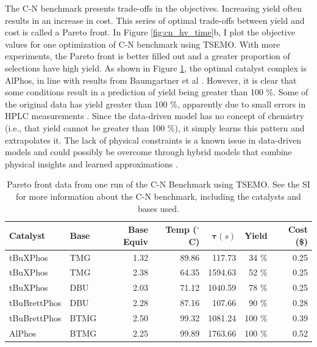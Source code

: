 The C-N benchmark presents trade-offs in the objectives. Increasing yield often results in an increase in cost. This series of optimal trade-offs between yield and cost is called a Pareto front. In Figure \ref{fig:cn_hv_time}b, I plot the objective values for one optimization of C-N benchmark using TSEMO. With more experiments, the Pareto front is better filled out and a greater proportion of selections have high yield. As shown in Figure \ref{tab:cn_benchmark_results}, the optimal catalyst complex is AlPhos, in line with results from Baumgartner et al \cite{Baumgartner2019}. However, it is clear that some conditions result in a prediction of yield being greater than 100 \%. Some of the original data has yield greater than 100 \%, apparently due to small errors in HPLC measurements \cite{Baumgartner2019}. Since the data-driven model has no concept of chemistry (i.e., that yield cannot be greater than 100 \%), it simply learns this pattern and extrapolates it. The lack of physical constraints is a known issue in data-driven models and could possibly be overcome through hybrid models that combine physical insights and learned approximations \cite{Thompson1994, Tsay2019}.

\begin{table}[tb]
    \centering
    \caption{Pareto front data from one run of the C-N Benchmark using TSEMO. See the SI for more information about the C-N benchmark, including the catalysts and bases used.
    }
    \begin{tabular}{llrrrrr}
    \hline
         \textbf{Catalyst} &  \textbf{Base} & \textbf{Base Equiv} & \textbf{Temp ($^{\circ}$ C)} &       $\mathbf{\tau} (s)$ &     \textbf{Yield} &      \textbf{Cost (\$)} \\
    \hline
     tBuXPhos &   TMG &             1.32 &       89.86 &   117.73 &  34 \% &  0.25 \\
     tBuXPhos &   TMG &             2.38 &       64.35 &  1594.63 &  52 \% &  0.25 \\
     tBuXPhos &   DBU &             2.03 &       71.12 &  1040.59 &  78 \% &  0.25 \\
 tBuBrettPhos &   DBU &             2.28 &       87.16 &   107.66 &  90 \% &  0.28 \\
 tBuBrettPhos &  BTMG &             2.50 &       99.32 &  1081.24 &  100 \% &  0.39 \\
       AlPhos &  BTMG &             2.25 &       99.89 &  1763.66 &  100 \% &  0.52 \\
    \end{tabular}

    \label{tab:cn_benchmark_results}
\end{table}

